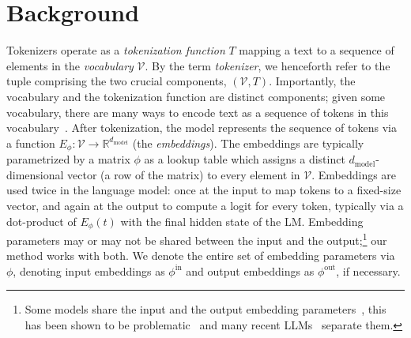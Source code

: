 \documentclass{article}
\begin{document}
\section{Background}
\label{sec:background}

 Tokenizers operate as a \textit{tokenization function} \(T\) mapping a text to a sequence of elements in the \textit{vocabulary} $\mathcal{V}$. By the term \textit{tokenizer}, we henceforth refer to the tuple comprising the two crucial components, $(\mathcal{V}, T)$. Importantly, the vocabulary and the tokenization function are distinct components; given some vocabulary, there are many ways to encode text as a sequence of tokens in this vocabulary~\citep[e.g.][]{hofmann-etal-2022-embarrassingly,uzan2024greed}. After tokenization, the model represents the sequence of tokens via a function \(E_\phi: \mathcal{V} \rightarrow \mathbb{R}^{d_{\text{model}}}\) (the \textit{embeddings}). The embeddings are typically parametrized by a matrix $\phi$ as a lookup table which assigns a distinct $d_{\text{model}}$-dimensional vector (a row of the matrix) to every element in $\mathcal{V}$. Embeddings are used twice in the language model: once at the input to map tokens to a fixed-size vector, and again at the output to compute a logit for every token, typically via a dot-product of $E_\phi(t)$ with the final hidden state of the LM. Embedding parameters may or may not be shared between the input and the output;\footnote{Some models share the input and the output embedding parameters~\citep[e.g.][]{conneau-etal-2020-unsupervised}, this has been shown to be problematic~\citep{chung2021rethinking} and many recent LLMs~\citep[e.g.][]{jiang2023mistral} separate them.} our method works with both. We denote the entire set of embedding parameters via $\phi$, denoting input embeddings as $\phi^{\text{in}}$ and output embeddings as $\phi^{\text{out}}$, if necessary.
\end{document}
